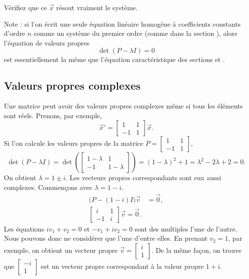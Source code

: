 \begin{exercise}
Vérifiez que ce $\vec{x}$ résout vraiment le système.
\end{exercise}

Note : si l'on écrit une seule équation linéaire homogène à coefficients constants d'ordre $n$ comme un système du premier ordre (comme dans la section ),
alors l'équation de valeurs propres
\begin{equation*}
\det(P - \lambda I) = 0
\end{equation*}
est essentiellement la même que l'équation caractéristique des sections
 et .

\subsection{Valeurs propres complexes}

Une matrice peut avoir des valeurs propres complexes même si tous les éléments sont réels. Prenons, par exemple,
\begin{equation*}
{\vec{x}}' = 
\begin{bmatrix}
1 & 1 \\
-1 & 1
\end{bmatrix}
\vec{x} .
\end{equation*}
Si l'on calcule les valeurs propres de la matrice $P = \left[ \begin{smallmatrix} 1 & 1 \\ -1 & 1 \end{smallmatrix}
\right]$,
\begin{equation*}
\det(P - \lambda I) =
\det\left(
\begin{bmatrix}
1-\lambda & 1 \\
-1 & 1-\lambda
\end{bmatrix}
\right)
= {(1-\lambda)}^2 + 1
= \lambda^2 - 2 \lambda + 2 = 0 .
\end{equation*}
On obtient $\lambda = 1 \pm i$.
Les vecteurs propres correspondants sont eux aussi complexes. Commençons avec $\lambda = 1-i$.
\begin{align*}
\bigl(P-(1-i) I\bigr) \vec{v} & = \vec{0} , \\
\begin{bmatrix}
i & 1 \\
-1 & i
\end{bmatrix}
\vec{v} = \vec{0}.
\end{align*}
Les équations $i v_1 + v_2 = 0$ et $-v_1 + iv_2 = 0$
sont des multiples l'une de l'autre. Nous pouvons donc ne considérer que l'une d'entre elles. En prenant $v_2 = 1$, par exemple, on obtient un vecteur propre
$\vec{v} = \left[ \begin{smallmatrix} i \\ 1 \end{smallmatrix} \right]$.
De la même façon, on trouve que
$\left[ \begin{smallmatrix} -i \\ 1 \end{smallmatrix} \right]$
est un vecteur propre correspondant à la valeur propre $1+i$.

